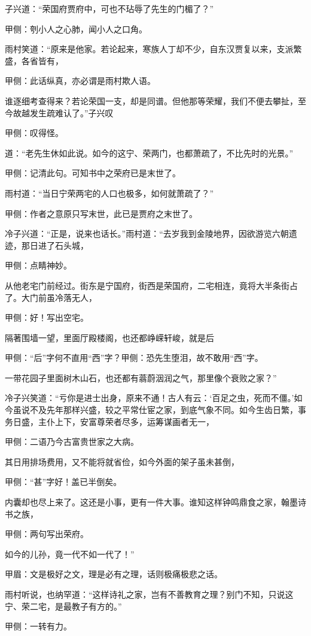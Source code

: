 \begin{parag}
    子兴道：“荣国府贾府中，可也不玷辱了先生的门楣了？”\begin{note}甲侧：刳小人之心肺，闻小人之口角。\end{note}雨村笑道：“原来是他家。若论起来，寒族人丁却不少，自东汉贾复以来，支派繁盛，各省皆有，\begin{note}甲侧：此话纵真，亦必谓是雨村欺人语。\end{note}谁逐细考查得来？若论荣国一支，却是同谱。但他那等荣耀，我们不便去攀扯，至今故越发生疏难认了。”子兴叹\begin{note}甲侧：叹得怪。\end{note}道：“老先生休如此说。如今的这宁、荣两门，也都萧疏了，不比先时的光景。”\begin{note}甲侧：记清此句。可知书中之荣府已是末世了。\end{note}雨村道：“当日宁荣两宅的人口也极多，如何就萧疏了？”\begin{note}甲侧：作者之意原只写末世，此已是贾府之末世了。\end{note}冷子兴道：“正是，说来也话长。”雨村道：“去岁我到金陵地界，因欲游览六朝遗迹，那日进了石头城，\begin{note}甲侧：点睛神妙。\end{note}从他老宅门前经过。街东是宁国府，街西是荣国府，二宅相连，竟将大半条街占了。大门前虽冷落无人，\begin{note}甲侧：好！写出空宅。\end{note}隔著围墙一望，里面厅殿楼阁，也还都峥嵘轩峻，就是后\begin{note}甲侧：“后”字何不直用“西”字？甲侧：恐先生堕泪，故不敢用“西”字。\end{note}一带花园子里面树木山石，也还都有蓊蔚洇润之气，那里像个衰败之家？”
\end{parag}


\begin{parag}
    冷子兴笑道：“亏你是进士出身，原来不通！古人有云：‘百足之虫，死而不僵。’如今虽说不及先年那样兴盛，较之平常仕宦之家，到底气象不同。如今生齿日繁，事务日盛，主仆上下，安富尊荣者尽多，运筹谋画者无一，\begin{note}甲侧：二语乃今古富贵世家之大病。\end{note}其日用排场费用，又不能将就省俭，如今外面的架子虽未甚倒，\begin{note}甲侧：“甚”字好！盖已半倒矣。\end{note}内囊却也尽上来了。这还是小事，更有一件大事。谁知这样钟鸣鼎食之家，翰墨诗书之族，\begin{note}甲侧：两句写出荣府。\end{note}如今的儿孙，竟一代不如一代了！”\begin{note}甲眉：文是极好之文，理是必有之理，话则极痛极悲之话。\end{note}雨村听说，也纳罕道：“这样诗礼之家，岂有不善教育之理？别门不知，只说这宁、荣二宅，是最教子有方的。”\begin{note}甲侧：一转有力。\end{note}
\end{parag}


